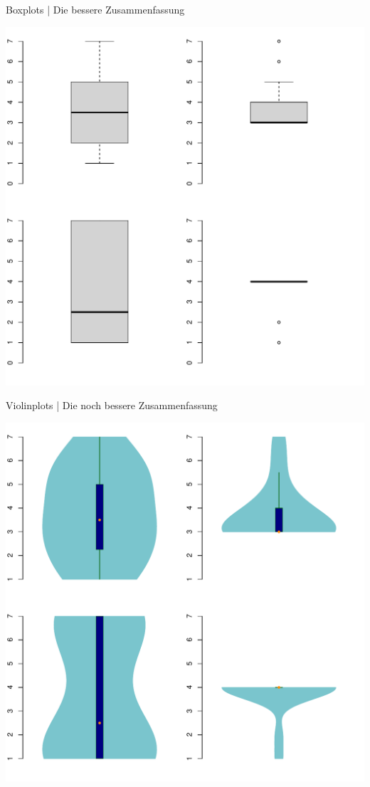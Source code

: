 \begin{frame}
  {Boxplots | Die bessere Zusammenfassung}
  \begin{center}
    \includegraphics[height=0.7\textheight]{RVorlesung/fourbox}
  \end{center}
\end{frame}


\begin{frame}
  {Violinplots | Die noch bessere Zusammenfassung}
  \begin{center}
    \includegraphics[height=0.7\textheight]{RVorlesung/fourviolins}
  \end{center}
\end{frame}

